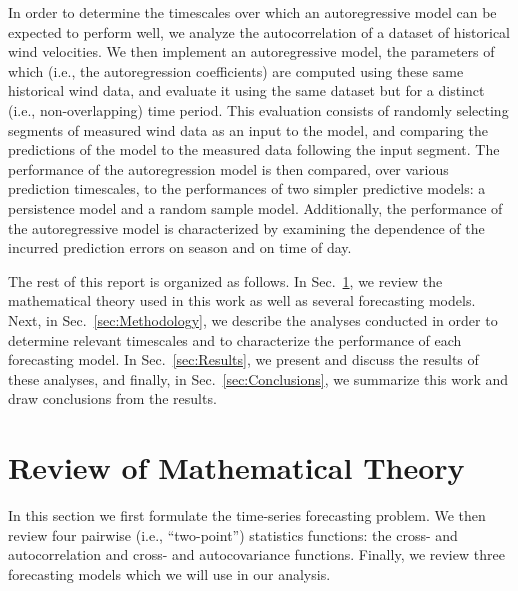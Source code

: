 \documentclass[11pt, oneside]{article}
\newcommand{\secref}[1]{Sec.~\ref{#1}}
\begin{document}
In order to determine the timescales over which an autoregressive model can be expected to perform well, we analyze the autocorrelation of a dataset of historical wind velocities.
We then implement an autoregressive model, the parameters of which (i.e., the autoregression coefficients) are computed using these same historical wind data, and evaluate it using the same dataset but for a distinct (i.e., non-overlapping) time period.
This evaluation consists of randomly selecting segments of measured wind data as an input to the model, and comparing the predictions of the model to the measured data following the input segment.
The performance of the autoregression model is then compared, over various prediction timescales, to the performances of two simpler predictive models: a persistence model and a random sample model.
Additionally, the performance of the autoregressive model is characterized by examining the dependence of the incurred prediction errors on season and on time of day.

The rest of this report is organized as follows.
In \secref{sec:Theory}, we review the mathematical theory used in this work as well as several forecasting models.
Next, in \secref{sec:Methodology}, we describe the analyses conducted in order to determine relevant timescales and to characterize the performance of each forecasting model.
In \secref{sec:Results}, we present and discuss the results of these analyses, and finally,
in \secref{sec:Conclusions}, we summarize this work and draw conclusions from the results.

\section{Review of Mathematical Theory}\label{sec:Theory}
In this section we first formulate the time-series forecasting problem.
We then review four pairwise (i.e., ``two-point'') statistics functions: the cross- and autocorrelation and cross- and autocovariance functions.
Finally, we review three forecasting models which we will use in our analysis.
\end{document}
